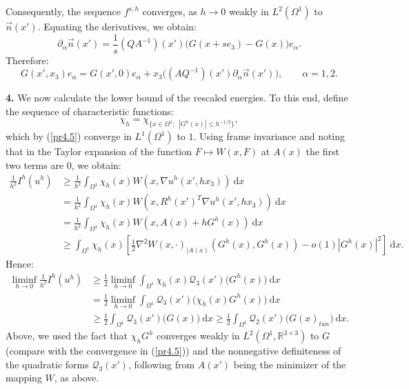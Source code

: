 \documentclass[leqno,twoside, 11pt]{amsart}
\theoremstyle{plain}
\theoremstyle{definition}
\numberwithin{equation}{section}
\numberwithin{figure}{section}
\begin{document}
Consequently, the sequence $f^{s,h}$ converges, as $h\to 0$ weakly in
$L^2(\Omega^1)$ to $\vec n(x')$. Equating the derivatives, we obtain:
$$\partial_\alpha \vec n(x') = \frac{1}{s} (QA^{-1})(x') 
\Big(G(x+se_3) - G(x)\Big)e_\alpha.$$
Therefore:
\begin{equation}\label{pr5}
G(x',x_3)e_\alpha = G(x',0) e_\alpha + x_3 \Big((AQ^{-1})(x') 
\partial_\alpha\vec n(x')\Big), \qquad \alpha=1,2.
\end{equation}

\medskip

{\bf 4.} We now calculate the lower bound of the rescaled energies.
To this end, define the sequence of characteristic functions:
$${\displaystyle \chi_h = \chi_{\{x\in\Omega^1; ~~|G^{h}(x)|\leq h^{-1/2}\}}},$$
which by (\ref{pr4.5}) converge in $L^1(\Omega^1)$ to $1$.
Using frame invariance and noting that in the Taylor expansion of the function 
$F\mapsto W(x,F)$ at $A(x)$ the first two terms are
$0$, we obtain:
\begin{equation*}
\begin{split}
\frac{1}{h^2} I^h(u^h) &\geq \frac{1}{h^2} \int_{\Omega^1} \chi_h(x)
W(x, \nabla u^h(x',hx_3))~\mbox{d}x\\
& = \frac{1}{h^2} \int_{\Omega^1} \chi_h(x) W (x, R^h(x')^T
\nabla u^h(x',hx_3))~\mbox{d}x\\
& = \frac{1}{h^2} \int_{\Omega^1} \chi_h(x) W (x, A(x)
+ hG^h(x))~\mbox{d}x\\
& \geq \int_{\Omega^1} \chi_h(x) \left[\frac{1}{2} \nabla^2 W
(x, \cdot)_{\mid A(x)} (G^h(x), G^h(x)) - 
{o}(1) |G^h(x)|^2\right]~\mbox{d}x.
\end{split}
\end{equation*}
Hence:
\begin{equation*}
\begin{split}
\liminf_{h\to 0}\frac{1}{h^2} I^h(u^h) &\geq \frac{1}{2} \liminf_{h\to 0}
\int_{\Omega^1} \chi_h(x)\mathcal{Q}_3(x')\Big(G^h(x)\Big)~\mbox{d}x  \\
& = \frac{1}{2} \liminf_{h\to 0}\int_{\Omega^1} 
\mathcal{Q}_3(x')\Big(\chi_h(x)G^h(x)\Big)~\mbox{d}x  \\
& \geq \frac{1}{2}\int_{\Omega^1} \mathcal{Q}_3(x')\Big(G(x)\Big)~\mbox{d}x
\geq \frac{1}{2}\int_{\Omega^1} \mathcal{Q}_2(x')\Big(G(x)_{tan}\Big)~\mbox{d}x.
\end{split}
\end{equation*}
Above, we used the fact that $\chi_hG^h$ converges weakly in 
$L^2(\Omega^1,\mathbb{R}^{3\times 3})$ to $G$ (compare with the convergence 
in (\ref{pr4.5}))
and the nonnegative definiteness of the quadratic forms 
$\mathcal{Q}_3(x')$, following from $A(x')$ being the minimizer 
of the mapping $W$, as above.
\end{document}
